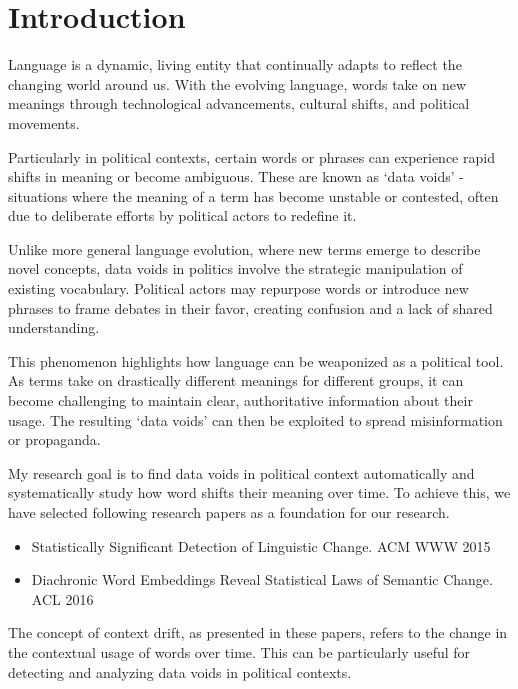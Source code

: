 
\section{Introduction} \label{sec:introduction}
Language is a dynamic, living entity that continually adapts to reflect the changing world around us.
With the evolving language, words take on new meanings through technological advancements, cultural shifts, and political movements.

Particularly in political contexts, certain words or phrases can experience rapid shifts in meaning or become ambiguous.
These are known as `data voids' - situations where the meaning of a term has become unstable or contested, often due to deliberate efforts by political actors to redefine it.

Unlike more general language evolution, where new terms emerge to describe novel concepts, data voids in politics involve the strategic manipulation of existing vocabulary.
Political actors may repurpose words or introduce new phrases to frame debates in their favor, creating confusion and a lack of shared understanding.

This phenomenon highlights how language can be weaponized as a political tool.
As terms take on drastically different meanings for different groups, it can become challenging to maintain clear, authoritative information about their usage.
The resulting `data voids' can then be exploited to spread misinformation or propaganda.

My research goal is to find data voids in political context automatically and systematically study how word shifts their meaning over time.
To achieve this, we have selected following research papers as a foundation for our research.

\begin{itemize}
    \item Statistically Significant Detection of Linguistic Change.
    ACM WWW 2015 ~\cite{kulkarni2014statisticallysignificantdetectionlinguistic}
    \item Diachronic Word Embeddings Reveal Statistical Laws of Semantic Change.
    ACL 2016 ~\cite{hamilton-etal-2016-diachronic}
\end{itemize}

The concept of context drift, as presented in these papers, refers to the change in the contextual usage of words over time.
This can be particularly useful for detecting and analyzing data voids in political contexts.

